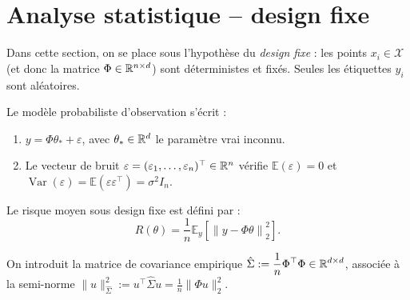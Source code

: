 
\section{Analyse statistique -- design fixe}

Dans cette section, on se place sous l'hypothèse du \emph{design fixe} : les points $x_i \in \mathcal{X}$ (et donc la matrice $\Phi \in \mathbb{R}^{n \times d}$) sont déterministes et fixés. Seules les étiquettes $y_i$ sont aléatoires.

\begin{definition}
    Le modèle probabiliste d'observation s'écrit :
    \begin{enumerate}
        \item $y = \Phi \theta_* + \varepsilon$, avec $\theta_* \in \mathbb{R}^d$ le paramètre vrai inconnu.
        \item Le vecteur de bruit $\varepsilon = (\varepsilon_1, \dots, \varepsilon_n)^\top \in \mathbb{R}^n$ vérifie $\mathbb{E}(\varepsilon) = 0$ et $\operatorname{Var}(\varepsilon) = \mathbb{E}(\varepsilon \varepsilon^\top) = \sigma^2 I_n$.
    \end{enumerate}
    Le risque moyen sous design fixe est défini par :
    \begin{equation}
        R(\theta) = \frac{1}{n} \mathbb{E}_y \left[ \left\| y - \Phi \theta \right\|_2^2 \right].
    \end{equation}
\end{definition}

On introduit la matrice de covariance empirique $\hat{\Sigma} := \displaystyle \frac{1}{n} \Phi^\top \Phi \in \mathbb{R}^{d \times d}$, associée à la semi-norme $\|u\|_{\hat{\Sigma}}^2 := u^\top \hat{\Sigma} u = \displaystyle \frac{1}{n} \|\Phi u\|_2^2$.

